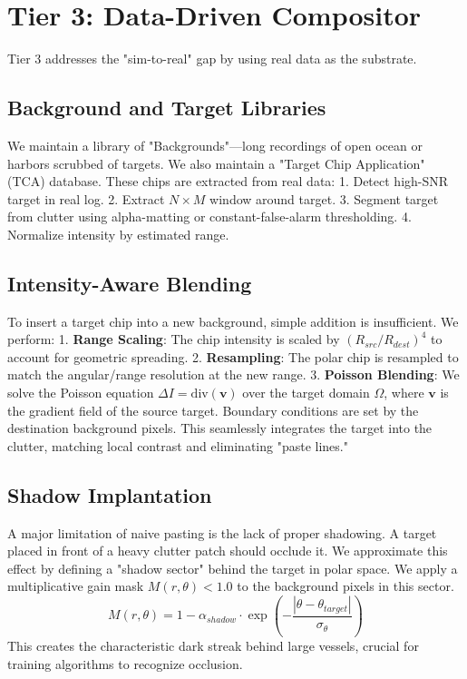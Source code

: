 \documentclass[conf]{new-aiaa}
\begin{document}
\section{Tier 3: Data-Driven Compositor}
Tier 3 addresses the "sim-to-real" gap by using real data as the substrate.

\subsection{Background and Target Libraries}
We maintain a library of "Backgrounds"—long recordings of open ocean or harbors scrubbed of targets. We also maintain a "Target Chip Application" (TCA) database. These chips are extracted from real data:
1. Detect high-SNR target in real log.
2. Extract $N \times M$ window around target.
3. Segment target from clutter using alpha-matting or constant-false-alarm thresholding.
4. Normalize intensity by estimated range.

\subsection{Intensity-Aware Blending}
To insert a target chip into a new background, simple addition is insufficient. We perform:
1. \textbf{Range Scaling}: The chip intensity is scaled by $(R_{src}/R_{dest})^4$ to account for geometric spreading.
2. \textbf{Resampling}: The polar chip is resampled to match the angular/range resolution at the new range.
3. \textbf{Poisson Blending}: We solve the Poisson equation $\Delta I = \text{div}(\mathbf{v})$ over the target domain $\Omega$, where $\mathbf{v}$ is the gradient field of the source target. Boundary conditions are set by the destination background pixels. This seamlessly integrates the target into the clutter, matching local contrast and eliminating "paste lines."

\subsection{Shadow Implantation}
A major limitation of naive pasting is the lack of proper shadowing. A target placed in front of a heavy clutter patch should occlude it. We approximate this effect by defining a "shadow sector" behind the target in polar space. We apply a multiplicative gain mask $M(r, \theta) < 1.0$ to the background pixels in this sector.
\begin{equation}
    M(r, \theta) = 1 - \alpha_{shadow} \cdot \exp\left(-\frac{|\theta - \theta_{target}|}{\sigma_\theta}\right)
\end{equation}
This creates the characteristic dark streak behind large vessels, crucial for training algorithms to recognize occlusion.
\end{document}
